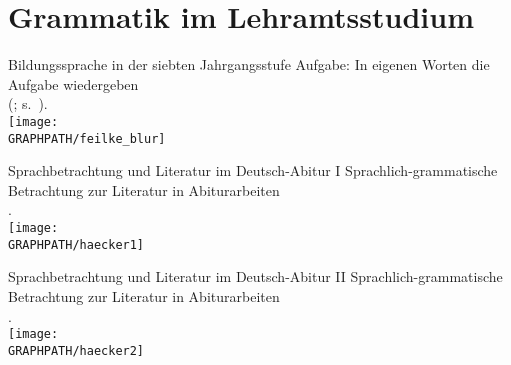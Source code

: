 
\section{Grammatik im Lehramtsstudium}

\begin{frame}
  {Bildungssprache in der siebten Jahrgangsstufe}
  \pause
  Aufgabe: In eigenen Worten die Aufgabe wiedergeben\\
  (\citealt{GogolinLange2011}; s.\ \citealt{Feilke2012}).\\[0.5\baselineskip]
  \pause
  \centering
  \texttt{[image: \\GRAPHPATH/feilke\_blur]}
\end{frame}

\begin{frame}
  {Sprachbetrachtung und Literatur im Deutsch-Abitur I}
  \pause
  Sprachlich-grammatische Betrachtung zur Literatur in Abiturarbeiten\\
  \citep{Haecker2009}.\\[\baselineskip]
  \pause
  \centering
  \texttt{[image: \\GRAPHPATH/haecker1]}
\end{frame}

\begin{frame}
  {Sprachbetrachtung und Literatur im Deutsch-Abitur II}
  Sprachlich-grammatische Betrachtung zur Literatur in Abiturarbeiten\\
  \citep{Haecker2009}.\\[\baselineskip]
  \centering
  \texttt{[image: \\GRAPHPATH/haecker2]}
\end{frame}

